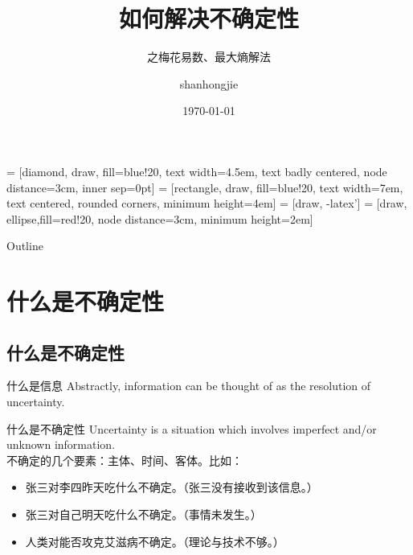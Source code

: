 \documentclass{beamer}
\title[如何解决不确定性] %
{如何解决不确定性}
\subtitle{之梅花易数、最大熵解法}
\author[shanhongjie] %
{shanhongjie}
\date[Short Occasion] %
{\today}
\begin{document}
 = [diamond, draw, fill=blue!20, 
    text width=4.5em, text badly centered, node distance=3cm, inner sep=0pt]
 = [rectangle, draw, fill=blue!20, 
    text width=7em, text centered, rounded corners, minimum height=4em]
 = [draw, -latex']
 = [draw, ellipse,fill=red!20, node distance=3cm,
    minimum height=2em]

\begin{frame}
  \titlepage
\end{frame}

\begin{frame}{Outline}
  \tableofcontents
\end{frame}





\section{什么是不确定性}

\subsection{什么是不确定性}
\begin{frame}{什么是信息}
  Abstractly, information can be thought of as the resolution of uncertainty.
\end{frame}
\begin{frame}{什么是不确定性}
  Uncertainty is a situation which involves imperfect and/or unknown information.
\\
  不确定的几个要素：主体、时间、客体。比如：
  \begin{itemize}
    \item 张三对李四昨天吃什么不确定。（张三没有接收到该信息。）
    \item 张三对自己明天吃什么不确定。（事情未发生。）
    \item 人类对能否攻克艾滋病不确定。（理论与技术不够。）
  \end{itemize}

\end{frame}
\end{document}
